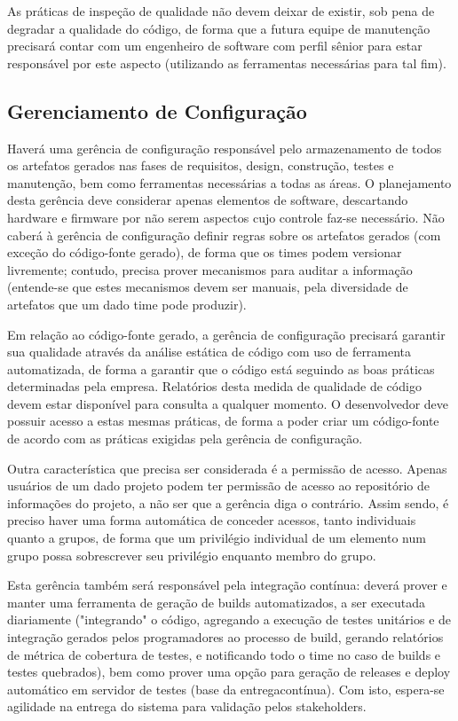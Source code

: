 \documentclass[12pt,journal,compsoc]{IEEEtran}
\begin{document}
As práticas de inspeção de qualidade não devem deixar de existir, sob pena de degradar a qualidade do código, de forma que a futura equipe de manutenção precisará contar com um engenheiro de software com perfil sênior para estar responsável por este aspecto (utilizando as ferramentas necessárias para tal fim).


\subsection{Gerenciamento de Configuração}

Haverá uma gerência de configuração responsável pelo armazenamento de todos os artefatos gerados nas fases de requisitos, design, construção, testes e manutenção, bem como ferramentas necessárias a todas as áreas. O planejamento desta gerência deve considerar apenas elementos de software, descartando hardware e firmware por não serem aspectos cujo controle faz-se necessário. Não caberá à gerência de configuração definir regras sobre os artefatos gerados (com exceção do código-fonte gerado), de forma que os times podem versionar livremente; contudo, precisa prover mecanismos para auditar a informação (entende-se que estes mecanismos devem ser manuais, pela diversidade de artefatos que um dado time pode produzir). 

Em relação ao código-fonte gerado, a gerência de configuração precisará garantir sua qualidade através da análise estática de código com uso de ferramenta automatizada, de forma a garantir que o código está seguindo as boas práticas determinadas pela empresa. Relatórios desta medida de qualidade de código devem estar disponível para consulta a qualquer momento. O desenvolvedor deve possuir acesso a estas mesmas práticas, de forma a poder criar um código-fonte de acordo com as práticas exigidas pela gerência de configuração. 

Outra característica que precisa ser considerada é a permissão de acesso. Apenas usuários de um dado projeto podem ter permissão de acesso ao repositório de informações do projeto, a não ser que a gerência diga o contrário. Assim sendo, é preciso haver uma forma automática de conceder acessos, tanto individuais quanto a grupos, de forma que um privilégio individual de um elemento num grupo possa sobrescrever seu privilégio enquanto membro do grupo.

Esta gerência também será responsável pela integração contínua: deverá prover e manter uma ferramenta de geração de builds automatizados, a ser executada diariamente ("integrando" o código, agregando a execução de testes unitários e de integração gerados pelos programadores ao processo de build, gerando relatórios de métrica de cobertura de testes, e notificando todo o time no caso de builds e testes quebrados), bem como prover uma opção para geração de releases e deploy automático em servidor de testes (base da entregacontínua). Com isto, espera-se agilidade na entrega do sistema para validação pelos stakeholders. 
\end{document}
